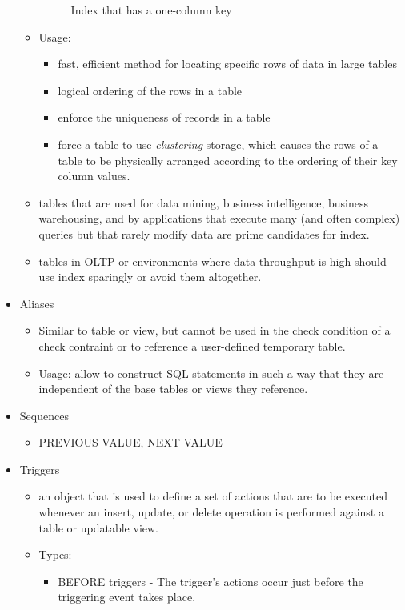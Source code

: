 \documentclass{article}
\begin{document}
\begin{itemize}
\begin{itemize}
\begin{figure}[h]
		\caption{Index that has a one-column key}
		\label{workloads}
		\end{figure}	
	\item Usage:
		\begin{itemize}
		\item fast, efficient method for locating specific rows of data in large tables
		\item logical ordering of the rows in a table
		\item enforce the uniqueness of records in a table
		\item force a table to use \textit{clustering} storage, which causes the rows of a table to be 
		physically arranged according to the ordering of their key column values.
		\end{itemize}
	\item tables that are used for data mining, business intelligence, business warehousing, and by
	applications that execute many (and often complex) queries but that rarely modify data are prime 
	candidates for index.
	\item tables in OLTP or environments where data throughput is high should use index sparingly or
	avoid them altogether.
	\end{itemize}
\item Aliases
	\begin{itemize}
	\item Similar to table or view, but cannot be used in the check condition of a check contraint
	or to reference a user-defined temporary table.
	\item Usage: allow to construct SQL statements in such a way that they are independent of the base
	tables or views they reference.
	\end{itemize}
\item Sequences
	\begin{itemize}
	\item PREVIOUS VALUE, NEXT VALUE
	\end{itemize}
\item Triggers
	\begin{itemize}
	\item an object that is used to define a set of actions that are to be executed whenever an insert,
	update, or delete operation is performed against a table or updatable view.
	\item Types:
		\begin{itemize}
		\item BEFORE triggers - The trigger's actions occur just before the triggering event takes place.

\end{itemize}
\end{itemize}
\end{itemize}
\end{document}
